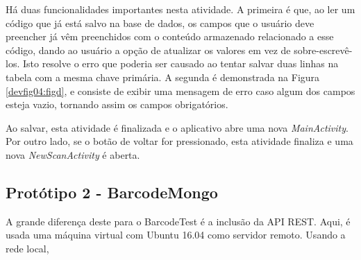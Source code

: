 Há duas funcionalidades importantes nesta atividade. A primeira é que, ao ler um código que já está salvo na base de dados, os campos que o usuário deve preencher já vêm preenchidos com o conteúdo armazenado relacionado a esse código, dando ao usuário a opção de atualizar os valores em vez de sobre-escrevê-los. Isto resolve o erro que poderia ser causado ao tentar salvar duas linhas na tabela com a mesma chave primária. A segunda é demonstrada na Figura \ref{devfig04:figd}, e consiste de exibir uma mensagem de erro caso algum dos campos esteja vazio, tornando assim os campos obrigatórios.

Ao salvar, esta atividade é finalizada e o aplicativo abre uma nova \textit{MainActivity}. Por outro lado, se o botão de voltar for pressionado, esta atividade finaliza e uma nova \textit{NewScanActivity} é aberta.

\subsection{Protótipo 2 - BarcodeMongo}

A grande diferença deste para o BarcodeTest é a inclusão da API REST. Aqui, é usada uma máquina virtual com Ubuntu 16.04 como servidor remoto. Usando a rede local, 






